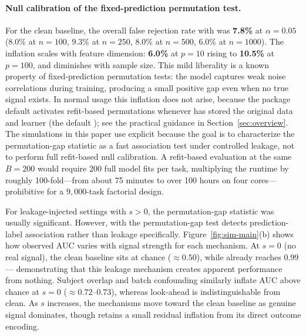 \documentclass[article,shortnames]{jss}
\begin{document}
\paragraph{Null calibration of the fixed-prediction permutation test.}
For the clean baseline, the overall false rejection rate with
 was \textbf{7.8\%} at $\alpha = 0.05$
($8.0\%$ at $n = 100$, $9.3\%$ at $n = 250$, $8.0\%$ at $n = 500$,
$6.0\%$ at $n = 1000$). The inflation scales with feature dimension:
\textbf{6.0\%} at $p = 10$ rising to \textbf{10.5\%} at $p = 100$, and
diminishes with sample size. This mild liberality is a known property of
fixed-prediction permutation tests: the model captures weak noise
correlations during training, producing a small positive gap even when no
true signal exists.
In normal usage this inflation does not arise, because the package
default  activates refit-based permutations
whenever  has stored the original data and learner
(the default ); see the practical
guidance in Section~\ref{sec:overview}. The simulations in this paper
use explicit  because the goal is to
characterize the permutation-gap statistic as a fast association test
under controlled leakage, not to perform full refit-based null
calibration. A refit-based evaluation at the same $B = 200$ would require $200$ full
model fits per task, multiplying the runtime by roughly 100-fold---from
about 75 minutes to over 100 hours on four cores---prohibitive for a
$9{,}000$-task factorial design.

For leakage-injected settings with $s > 0$, the permutation-gap statistic was
usually significant. However, with  the
permutation-gap test detects prediction-label association rather than leakage
specifically. Figure~\ref{fig:sim-main}(b) shows how observed AUC varies with signal
strength for each mechanism. At $s = 0$ (no real signal), the clean baseline
sits at chance ($\approx 0.50$), while  already reaches
$0.99$ --- demonstrating that this leakage mechanism creates apparent
performance from nothing. Subject overlap and batch confounding similarly
inflate AUC above chance at $s = 0$ ($\approx 0.72$--$0.73$), whereas
look-ahead is indistinguishable from clean. As $s$ increases, the mechanisms
move toward the clean baseline as genuine signal dominates, though
 retains a small residual inflation from its direct outcome
encoding.
\end{document}

